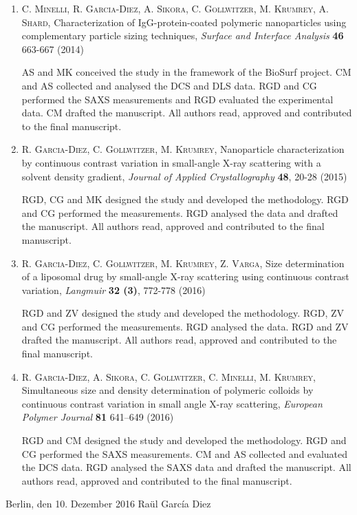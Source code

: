 \begin{enumerate}

    \item \textsc{C. Minelli, R. Garcia-Diez, A. Sikora, C. Gollwitzer, M. Krumrey, A. Shard}, Characterization of IgG-protein-coated polymeric nanoparticles using complementary particle sizing techniques, \emph{Surface and Interface Analysis} \textbf{46} 663-667 (2014)

        \hspace{10pt} AS and MK conceived the study in the framework of the BioSurf project. CM and AS collected and analysed the DCS and DLS data. RGD and CG performed the SAXS measurements and RGD evaluated the experimental data. CM drafted the manuscript. All authors read, approved and contributed to the final manuscript.

    \item \textsc{R. Garcia-Diez, C. Gollwitzer, M. Krumrey}, Nanoparticle characterization by continuous contrast variation in small-angle {{X}}-ray scattering with a solvent density gradient, \emph{Journal of Applied Crystallography} \textbf{48}, 20-28 (2015)

        \hspace{10pt} RGD, CG and MK designed the study and developed the methodology. RGD and CG performed the measurements. RGD analysed the data and drafted the manuscript. All authors read, approved and contributed to the final manuscript.

    \item \textsc{R. Garcia-Diez, C. Gollwitzer, M. Krumrey, Z. Varga}, Size determination of a liposomal drug by small-angle X-ray scattering using continuous contrast variation, \emph{Langmuir} \textbf{32 (3)}, 772-778 (2016)

        \hspace{10pt} RGD and ZV designed the study and developed the methodology. RGD, ZV and CG performed the measurements. RGD analysed the data. RGD and ZV drafted the manuscript. All authors read, approved and contributed to the final manuscript.
        
    \item \textsc{R. Garcia-Diez, A. Sikora, C. Gollwitzer, C. Minelli, M. Krumrey}, Simultaneous size and density determination of polymeric colloids by continuous contrast variation in small angle {{X}}-ray scattering, \emph{European Polymer Journal} \textbf{81} 641–649 (2016) 

        \hspace{10pt} RGD and CM designed the study and developed the methodology. RGD and CG performed the SAXS measurements. CM and AS collected and evaluated the DCS data. RGD analysed the SAXS data and drafted the manuscript. All authors read, approved and contributed to the final manuscript.

\end{enumerate}

\vspace{3cm}

\noindent Berlin, den 10. Dezember 2016 \hfill Raül Garc\'{i}a Diez

\cleardoublepage
